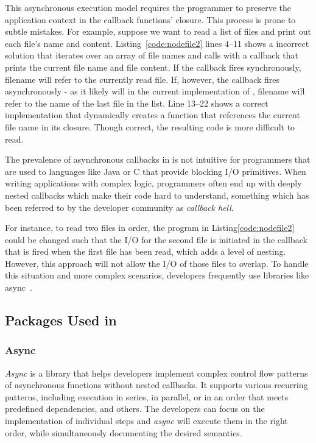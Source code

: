 This asynchronous execution model requires the programmer to preserve the
application context in the callback functions' closure.  This process
is prone to subtle mistakes.  For example, suppose we want to
read a list of files and print out each file's name and content.
Listing~\ref{code:nodefile2}  lines 4--11 shows a incorrect solution that
iterates over an array of file names and calls  with a callback
that prints the current file name and file content. 
If the callback fires synchronously, filename will refer to the currently
read file. If, however, the callback fires asynchronously - as it likely will
in the current implementation of , filename will refer to the
name of the last file in the list.
Line 13--22 shows a correct implementation that dynamically creates a function 
that references the current file name in its closure.
Though correct, the resulting code is more difficult to read.


The prevalence of asynchronous callbacks in \js is not intuitive for
programmers that are used to languages like Java or C that provide blocking I/O 
primitives.
When writing applications with complex logic, programmers often end up with deeply
nested callbacks which make their code hard to understand, something which has
been referred to by the developer community as \emph{callback hell}. 

For instance, to read two files in order, the program in Listing\ref{code:nodefile2} could
be changed such that the I/O for the second file is initiated in the callback
that is fired when the first file has been read, which adds a level of nesting.
However, this approach will not allow the I/O of those files to overlap.
To handle this situation and more complex scenarios, developers frequently use 
libraries like async~\cite{async}. %


\subsection{\nodejs Packages Used in \cb}
\label{sec:nodepackage}

\subsubsection{Async}
\emph{Async} is a library that helps developers implement complex control 
flow patterns of asynchronous functions without nested callbacks.
It supports various recurring patterns, including
execution in series, in parallel, or in an order that meets predefined dependencies,
and others.
The developers can focus on the implementation of individual steps
and \emph{async} will execute them in the right order, while simultaneously 
documenting the desired semantics.

